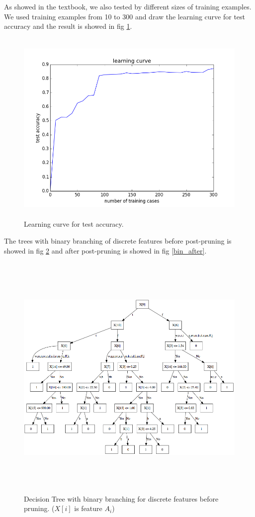 \documentclass[11pt]{article}
\begin{document}
As showed in the textbook, we also tested by different sizes of training examples. We used training examples from 10 to 300
and draw the learning curve for test accuracy and the result is showed in fig \ref{learn}.
\begin{figure}[h!]
\centering
\includegraphics[height=3.75in, width=5in]{learn.png}
\caption{Learning curve for test accuracy.}
\label{learn}
\end{figure}

The trees with binary branching of discrete features before post-pruning is showed in fig \ref{bin_before} and after post-pruning is showed in fig \ref{bin_after}.

\begin{figure}[h!]
\centering
\includegraphics[height=4.8in, width=6.5in]{bin_before.png}
\caption{Decision Tree with binary branching for discrete features before pruning. ($X[i]$ is feature $A_i$)}
\label{bin_before}
\end{figure}
\end{document}
